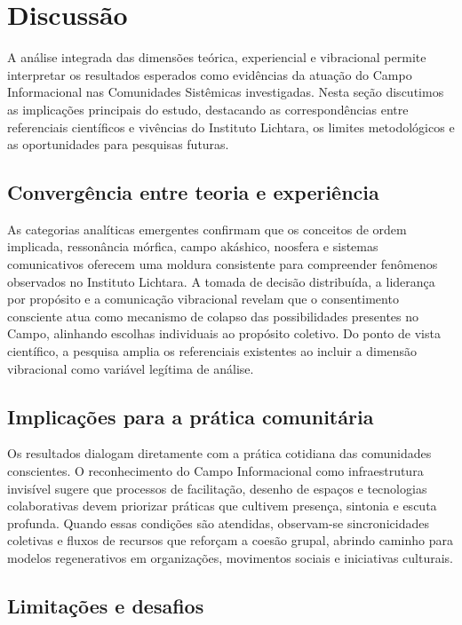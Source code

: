 \section{Discussão}

A análise integrada das dimensões teórica, experiencial e vibracional
permite interpretar os resultados esperados como evidências da atuação
do Campo Informacional nas Comunidades Sistêmicas investigadas. Nesta
seção discutimos as implicações principais do estudo, destacando as
correspondências entre referenciais científicos e vivências do Instituto
Lichtara, os limites metodológicos e as oportunidades para pesquisas
futuras.

\subsection{Convergência entre teoria e experiência}

As categorias analíticas emergentes confirmam que os conceitos de ordem
implicada, ressonância mórfica, campo akáshico, noosfera e sistemas
comunicativos \citep{bohm1980wholeness,sheldrake1981new,laszlo2004science,teilhard1955phenomenon,luhmann1995social}
oferecem uma moldura consistente para compreender fenômenos observados no
Instituto Lichtara. A tomada de decisão distribuída, a liderança por
propósito e a comunicação vibracional revelam que o consentimento
consciente atua como mecanismo de colapso das possibilidades presentes no
Campo, alinhando escolhas individuais ao propósito coletivo. Do ponto de
vista científico, a pesquisa amplia os referenciais existentes ao
incluir a dimensão vibracional como variável legítima de análise.

\subsection{Implica\c{c}\~oes para a pr\'atica comunit\'aria}

Os resultados dialogam diretamente com a prática cotidiana das
comunidades conscientes. O reconhecimento do Campo Informacional como
infraestrutura invisível sugere que processos de facilitação, desenho de
espaços e tecnologias colaborativas devem priorizar práticas que
cultivem presença, sintonia e escuta profunda. Quando essas condições
são atendidas, observam-se sincronicidades coletivas e fluxos de recursos
que reforçam a coesão grupal, abrindo caminho para modelos regenerativos
em organizações, movimentos sociais e iniciativas culturais.

\subsection{Limita\c{c}\~oes e desafios}

